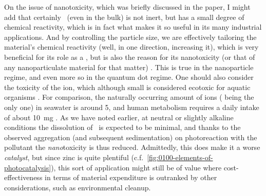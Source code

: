 \documentclass[draft,webedition,openright,titles,swedish,english]{LuaUUThesis}\usepackage[]{graphicx}\usepackage[]{xcolor}
\newcommand{\cf}{c.f.}
\begin{document}
On the issue of nanotoxicity, which was briefly discussed in the paper,
I might add that certainly \ZnO\ (even in the bulk) is not inert, but has
a small degree of chemical reactivity, which is in fact what makes it so useful
in its many industrial applications.
And by controlling the particle size, we are effectively tailoring the material's
chemical reactivity (well, in one direction, increasing it), which is very
beneficial for its role as a , but is also the reason
for its nanotoxicity (or that of any nanoparticulate material for that matter)
\cite{Zhang2012,Zhang2021a,Mitchell2019,Reed2012}.
This is true in the nanoparticle  regime, and even more so in the quantum dot regime.
One should also consider the toxicity of the  ion, which although
small is considered ecotoxic for aquatic organisms \cite{Moezzi2012}. For comparison,
the naturally occurring amount of  ions ( being the only one)
in seawater is around \qty{5}{\ppb}, and human metabolism requires a daily intake
of about \qty{10}{\mg} \cite{Moezzi2012}.
As we have noted earlier, at neutral or slightly alkaline conditions the dissolution
of \ZnO\ is expected to be minimal, and thanks to the observed aggregation (and
subsequent sedimentation) on photoreaction with the pollutant the \emph{nano}toxicity
is thus reduced. Admittedly, this does make it a worse \emph{catalyst}, but
since zinc is quite plentiful (\cf\ \cref{fig:0100-elements-of-photocatalysis}),
this sort of application might still be of value where cost-effectiveness in
terms of material expenditure is outranked by other considerations, such as
environmental cleanup.


%

%
\end{document}
